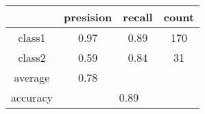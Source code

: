 
    \begin{tabular}{ | c | c | c | c | }
	\hline
	         &presision & recall & count \\ \hline
	class1   & 0.97    & 0.89  & 170 \\ \hline
	class2   & 0.59    & 0.84  & 31 \\ \hline
	average  & 0.78    &        &       \\
	\hline
	accuracy & \multicolumn{3}{c|}{0.89}\\
	\hline
    \end{tabular}
